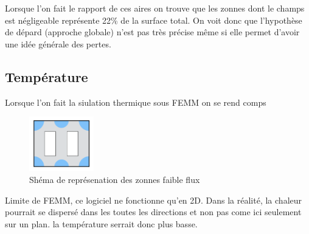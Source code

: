 Lorsque l'on fait le rapport de ces aires on trouve que les zonnes dont le champs est négligeable représente 22\% de la surface total. On voit donc que l'hypothèse de dépard (approche globale) n'est pas très précise même si elle permet d'avoir une idée générale des pertes.


\subsection{Température}

Lorsque l'on fait la siulation thermique sous FEMM on se rend comps 
\begin{figure}[ht]
	\begin{center}
	\includegraphics[width=0.25\textwidth]{images/TP3_zones_mortes}
	\caption{Shéma de représenation des zonnes faible flux}\label{img:RepChamps}
	\end{center}
\end{figure}

Limite de FEMM, ce logiciel ne fonctionne qu'en 2D. Dans la réalité, la chaleur pourrait se dispersé dans les toutes les directions et non pas come ici seulement sur un plan. la température serrait donc plus basse. 
